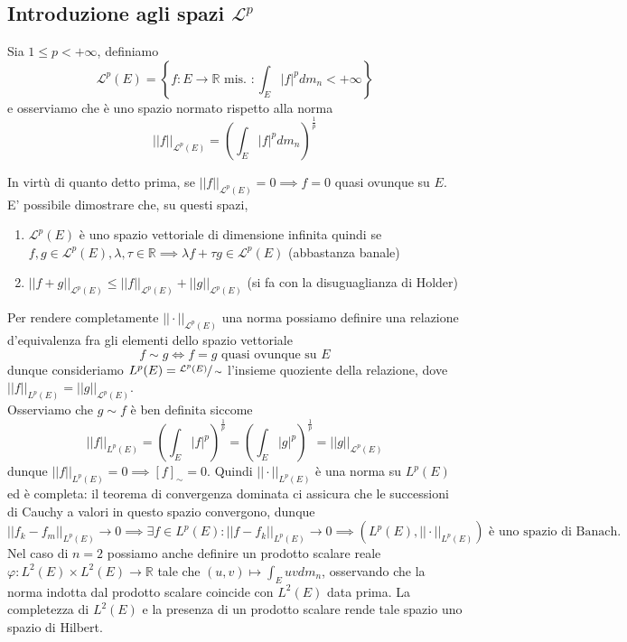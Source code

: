 \subsection{Introduzione agli spazi $\mathcal{L}^p$ }
%
\begin{definition}
	Sia $1 \leq p < +\infty$, definiamo
	$$
	\mathcal{L}^p(E) = \left\{ f: E \to \mathbb{R} \text{ mis. } : \int_E |f|^p dm_n < +\infty \right\}
	$$
	e osserviamo che è uno spazio normato rispetto alla norma
	$$
	|| f ||_{\mathcal{L}^p(E)} = \left( \int_E |f|^p dm_n \right)^{\frac{1}{p}}
	$$
\end{definition}
%
In virtù di quanto detto prima, se $|| f ||_{\mathcal{L}^p(E)} = 0 \implies f = 0$ quasi ovunque su $E$. E' possibile dimostrare che, su questi spazi,
%
\begin{enumerate}[label=\protect\circled{\arabic*}]
	\item $\mathcal{L}^p(E)$ è uno spazio vettoriale di dimensione infinita quindi se $f, g \in \mathcal{L}^p(E), \lambda, \tau \in \mathbb{R} \implies \lambda f + \tau g \in \mathcal{L}^p(E)$ (abbastanza banale)
	\item $|| f + g ||_{\mathcal{L}^p(E)} \leq || f ||_{\mathcal{L}^p(E)} + || g ||_{\mathcal{L}^p(E)}$	(si fa con la disuguaglianza di Holder)
\end{enumerate}
%
Per rendere completamente $|| \cdot ||_{\mathcal{L}^p(E)}$ una norma possiamo definire una relazione d'equivalenza fra gli elementi dello spazio vettoriale
$$
f \sim g \iff f = g \text{ quasi ovunque su } E
$$
dunque consideriamo $L^p(E) = \sfrac{\mathcal{L}^p(E)}{\sim}$ l'insieme quoziente della relazione, dove $|| f ||_{L^p(E)} = || g ||_{\mathcal{L}^p(E)}$. \\
Osserviamo che $g \sim f$ è ben definita siccome
$$
|| f ||_{L^p(E)} = \left(\int_E |f|^p \right)^{\frac{1}{p}} = \left(\int_E |g|^p \right)^{\frac{1}{p}} = || g ||_{\mathcal{L}^p(E)}
$$
dunque $|| f ||_{L^p(E)} = 0 \implies [f]_{\sim} = 0$. Quindi $|| \cdot ||_{L^p(E)}$ è una norma su $L^p(E)$ ed è completa: il teorema di
convergenza dominata ci assicura che le successioni di Cauchy a valori in questo spazio convergono, dunque
$$
|| f_k - f_m ||_{L^p(E)} \to 0 \implies \exists f \in L^p(E) : || f - f_k ||_{L^p(E)} \to 0 \implies (L^p(E), || \cdot ||_{L^p(E)}) \text{ è uno spazio di Banach}.
$$
Nel caso di $n=2$ possiamo anche definire un prodotto scalare reale $\varphi: L^2(E) \times L^2(E) \to \mathbb{R}$ tale che $(u, v) \mapsto \int_E uv dm_n$, osservando che
la norma indotta dal prodotto scalare coincide con $L^2(E)$ data prima. La completezza di $L^2(E)$ e la presenza di un prodotto scalare rende tale spazio uno spazio di Hilbert.
%
\vspace{0.5cm}
